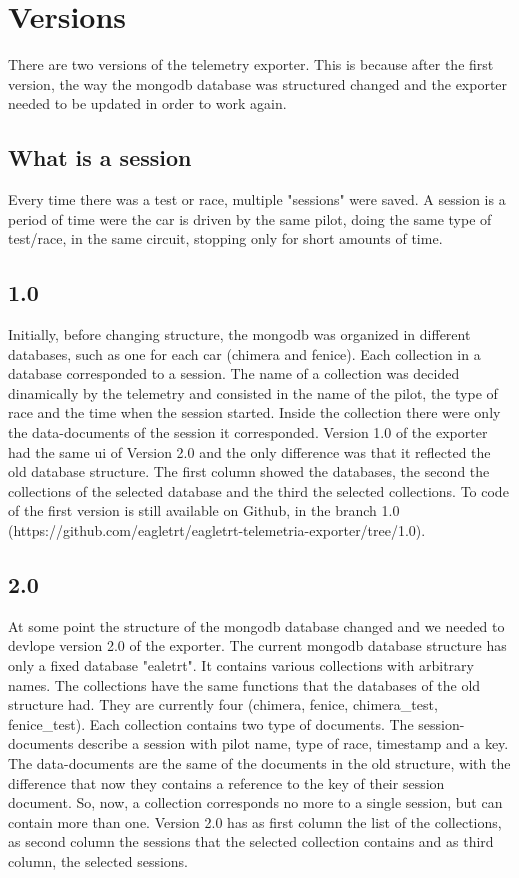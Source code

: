 \section{\huge{Versions}}
There are two versions of the telemetry exporter. 
This is because after the first version, the way the mongodb database was structured changed and the exporter needed to be updated 
in order to work again.

\subsection{What is a session}
Every time there was a test or race, multiple "sessions" were saved. A session is a period of time were the car is driven by the same pilot,
doing the same type of test/race, in the same circuit, stopping only for short amounts of time.

\subsection{1.0}
Initially, before changing structure, the mongodb was organized in different databases, such as one for each car (chimera and fenice). 
Each collection in a database corresponded to a session. The name of a collection was decided dinamically by the telemetry and consisted
in the name of the pilot, the type of race and the time when the session started. Inside the collection there were only the data-documents
of the session it corresponded. 
Version 1.0 of the exporter had the same ui of Version 2.0 and the only difference was that it reflected the old database structure. The
first column showed the databases, the second the collections of the selected database and the third the selected collections.
To code of the first version is still available on Github, in the branch 1.0 (https://github.com/eagletrt/eagletrt-telemetria-exporter/tree/1.0).

\subsection{2.0}
At some point the structure of the mongodb database changed and we needed to devlope version 2.0 of the exporter. The current mongodb database
structure has only a fixed database "ealetrt". It contains various collections with arbitrary names. The collections have the same functions
that the databases of the old structure had. They are currently four (chimera, fenice, chimera\_test, fenice\_test). Each collection contains 
two type of documents. The session-documents describe a session with pilot name, type of race, timestamp and a key. The data-documents are the
same of the documents in the old structure, with the difference that now they contains a reference to the key of their session document. So,
now, a collection corresponds no more to a single session, but can contain more than one.
Version 2.0 has as first column the list of the collections, as second column the sessions that the selected collection contains and as third 
column, the selected sessions.